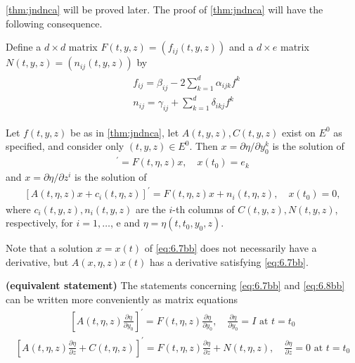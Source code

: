\documentclass{article}
\newcommand{\bfs}[1]{\textbf{({#1}) }}
\begin{document}
\cref{thm:jndnca} will be proved later. The proof of \cref{thm:jndnca}  will have the following consequence.
\begin{defa}
Define a $d \times d$ matrix $F(t, y, z)=\left(f_{i j}(t, y, z)\right)$ and a $d \times e$ matrix $N(t, y, z)=\left(n_{i j}(t, y, z)\right)$ by
\begin{align*}
\begin{aligned}
&f_{i j}=\beta_{i j}-2 \sum_{k=1}^{d} \alpha_{i j k} f^{k} \\
&n_{i j}=\gamma_{i j}+\sum_{k=1}^{d} \delta_{i k j} f^{k}
\end{aligned}
\end{align*}
\end{defa}

\begin{cora}
 Let $f(t, y, z)$ be as in \cref{thm:jndnca}, let $A(t, y, z), C(t, y, z)$ exist on $E^{0}$ as specified, and consider only $(t, y, z) \in E^{0} .$ Then $x=\partial \eta / \partial y_{0}^{k}$ is the solution of
\begin{align}
[A(t, \eta, z) x]^{\prime}=F(t, \eta, z) x, \quad x\left(t_{0}\right)=e_{k}\label{eq:6.7bb}
\end{align}
and $x=\partial \eta / \partial z^{i}$ is the solution of
\begin{align}
    \left[A(t, \eta, z) x+c_{i}(t, \eta, z)\right]^{\prime}=F(t, \eta, z) x+n_{i}(t, \eta, z), \quad x\left(t_{0}\right)=0,\label{eq:6.8bb}
\end{align}
where $c_{i}(t, y, z), n_{i}(t, y, z)$ are the $i$-th columns of $C(t, y, z), N(t, y, z)$, respectively, for $i=1, \ldots$, e and $\eta=\eta\left(t, t_{0}, y_{0}, z\right)$.
\end{cora} 
\begin{rema}
Note that a solution $x=x(t)$ of \cref{eq:6.7bb} does not necessarily have a derivative, but $A(x, \eta, z) x(t)$ has a derivative satisfying \cref{eq:6.7bb}. %
\end{rema}

\begin{rema}\bfs{equivalent statement}
The statements concerning \cref{eq:6.7bb} and \cref{eq:6.8bb} can be written more conveniently as matrix equations
\begin{align}
    \left[A(t, \eta, z) \frac{\partial \eta}{\partial y_{0}}\right]^{\prime}=F(t, \eta, z) \frac{\partial \eta}{\partial y_{0}}, \quad \frac{\partial \eta}{\partial y_{0}}=I\text{ at }t=t_{0}
\end{align}
\begin{align}
    \left[A(t, \eta, z) \frac{\partial \eta}{\partial z}+C(t, \eta, z)\right]^{\prime}=F(t, \eta, z) \frac{\partial \eta}{\partial z}+N(t, \eta, z), \quad \frac{\partial \eta}{\partial z}=0\text{ at }t=t_{0}
\end{align}
\end{rema}




\end{document}
